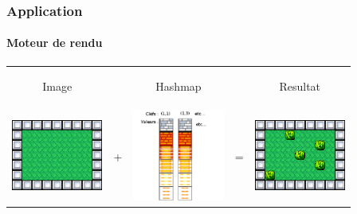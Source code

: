 	\begin{frame}
	\frametitle{Application}
	\framesubtitle{Moteur de rendu}
	
		\begin{tabular}{ccccc}
			\begin{minipage}{3cm}
				\begin{center}
					Image
				\end{center}		
			\end{minipage} & &
			\begin{minipage}{2cm}
				\begin{center}
					Hashmap
				\end{center}
			\end{minipage} & &
			\begin{minipage}{3cm}
				\begin{center}
					Resultat
				\end{center}
			\end{minipage}\\
			\begin{minipage}{3cm}
				\includegraphics[width=3cm]{img/bitmap.png}
			\end{minipage} & + &
			\begin{minipage}{2cm}
				\includegraphics[width=3cm]{img/hashmap.png} 
			\end{minipage} & = &
			\begin{minipage}{3cm}
				\includegraphics[width=3cm]{img/map.png} 
			\end{minipage}\\
		\end{tabular}
	
	\end{frame}
	
